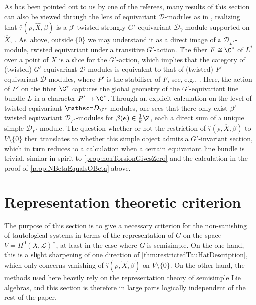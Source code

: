 \documentclass[JEP,XML,SOM,Unicode,published]{cedram}
\newcommand{\bme}{{\boldsymbol{e}}}
\newcommand{\cL}{\mathcal{L}}
\begin{document}
\begin{rmk}\label{rmk:RemarkToReferee}
As has been pointed out to us by one of the referees, many results of this section can also be viewed through the lens of equivariant $\mathscr D$\nobreakdash-mod\-ules as in \cite{BeilinsonBernstein_Jantzen}, realizing that $\hat \tau(\rho, \hat X, \beta)$ is a $\beta'$-twisted strongly $G'$-equivariant $\mathscr D_V$\nobreakdash-mod\-ule supported on $\hat X$, \cite[Def.\,p.\,16]{Hot98}. As~above, outside $\{0\}$ we may understand it as a direct image of a $\mathscr D_{L^*}$\nobreakdash-mod\-ule, twisted equivariant under a transitive $G'$-action. The fiber $F \cong \C^*$ of $L^*$ over a point of $X$ is a slice for the $G'$-action, which implies that the category of (twisted) $G'$-equivariant $\mathscr D$\nobreakdash-mod\-ules is equivalent to that of (twisted) $P'$-equivariant $\mathscr D$\nobreakdash-mod\-ules, where $P'$ is the stabilizer of $F$, see, e.g., \cite[Prop.\,4.5]{Lorincz-Walther}. Here, the action of $P'$ on the fiber $\C^*$ captures the global geometry of the $G'$-equivariant line bundle $L$ in a character $P' \to \C^*$. Through an explicit calculation on the level of twisted equivariant $\mathscr D_{\C^*}$\nobreakdash-mod\-ules, one sees that there only exist $\beta'$-twisted equivariant $\mathscr D_{L^*}$\nobreakdash-mod\-ules for $\beta(\bme)\in \frac{1}{k} \Z$, each a direct sum of a unique simple $\mathscr D_{L^*}$\nobreakdash-mod\-ule. The question whether or not the restriction of $\hat \tau(\rho, \overline X, \beta)$ to $V \setminus \{0\}$ then translates to whether this simple object admits a $G'$-invariant section, which in turn reduces to a calculation when a certain equivariant line bundle is trivial, similar in spirit to \cref{prop:nonTorsionGivesZero} and the calculation in the proof of \cref{prop:NBetaEqualsOBeta} above.
\end{rmk}

\section{Representation theoretic criterion}\label{sec:FormuleBeta}

The purpose of this section is to give a necessary criterion for the non-vanishing of tautological systems in terms of the representation of $G$ on the space $V=H^0(X,\cL)^\vee$, at least in the case where $G$ is semisimple. On the one hand, this is a slight sharpening of one direction of \cref{thm:restrictedTauHatDescription}, which only concerns vanishing of $\hat{\tau}(\rho,\hat{X},\beta)$ on $V\setminus\{0\}$. On the other hand, the methods used
here heavily rely on the representation theory of semisimple Lie algebras, and this section is therefore in large parts logically independent of the rest of the paper.
\end{document}
